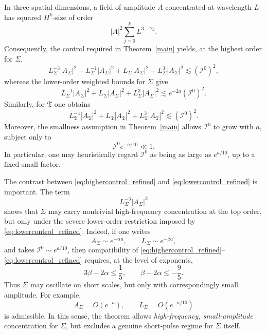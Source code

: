\documentclass{amsart}
\begin{document}
\noindent In three spatial dimensions, a field of amplitude \(A\) concentrated at wavelength \(L\) has squared \(H^{k}\)-size of order
\[
|A|^{2}\sum_{j=0}^{k} L^{3-2j}.
\]
Consequently, the control required in Theorem~\ref{main} yields, at the highest order for \(\Sigma\),
\begin{equation}\label{eq:highercontrol_refined}
L_{\Sigma}^{-3}|A_{\Sigma}|^{2}
+L_{\Sigma}^{-1}|A_{\Sigma}|^{2}
+L_{\Sigma}|A_{\Sigma}|^{2}
+L_{\Sigma}^{3}|A_{\Sigma}|^{2}
\lesssim (\mathcal I^{0})^{2},
\end{equation}
whereas the lower-order weighted bounds for \(\Sigma\) give
\begin{equation}\label{eq:lowercontrol_refined}
L_{\Sigma}^{-1}|A_{\Sigma}|^{2}
+L_{\Sigma}|A_{\Sigma}|^{2}
+L_{\Sigma}^{3}|A_{\Sigma}|^{2}
\lesssim e^{-2a}(\mathcal I^{0})^{2}.
\end{equation}
Similarly, for \(\mathfrak T\) one obtains
\begin{equation}\label{eq:ampl_refined}
L_{\mathfrak T}^{-1}|A_{\mathfrak T}|^{2}
+L_{\mathfrak T}|A_{\mathfrak T}|^{2}
+L_{\mathfrak T}^{3}|A_{\mathfrak T}|^{2}
\lesssim (\mathcal I^{0})^{2}.
\end{equation}
Moreover, the smallness assumption in Theorem~\ref{main} allows \(\mathcal I^{0}\) to grow with \(a\), subject only to
\[
\mathcal I^{0}e^{-a/10}\ll 1.
\]
In particular, one may heuristically regard \(\mathcal I^{0}\) as being as large as \(e^{a/10}\), up to a fixed small factor.

\noindent The contrast between \eqref{eq:highercontrol_refined} and \eqref{eq:lowercontrol_refined} is important. The term
\[
L_{\Sigma}^{-3}|A_{\Sigma}|^{2}
\]
shows that \(\Sigma\) may carry nontrivial high-frequency concentration at the top order, but only under the severe lower-order restriction imposed by \eqref{eq:lowercontrol_refined}. Indeed, if one writes
\[
A_{\Sigma}\sim e^{-\alpha a},
\qquad
L_{\Sigma}\sim e^{-\beta a},
\]
and takes \(\mathcal I^{0}\sim e^{a/10}\), then compatibility of
\eqref{eq:highercontrol_refined}--\eqref{eq:lowercontrol_refined} requires, at the level of exponents,
\[
3\beta-2\alpha\le \frac15,
\qquad
\beta-2\alpha\le -\frac95.
\]
Thus \(\Sigma\) may oscillate on short scales, but only with correspondingly small amplitude. For example,
\[
A_{\Sigma}=O(e^{-a}),
\qquad
L_{\Sigma}=O(e^{-a/10})
\]
is admissible. In this sense, the theorem allows \emph{high-frequency, small-amplitude} concentration for \(\Sigma\), but excludes a genuine short-pulse regime for \(\Sigma\) itself.
\end{document}

